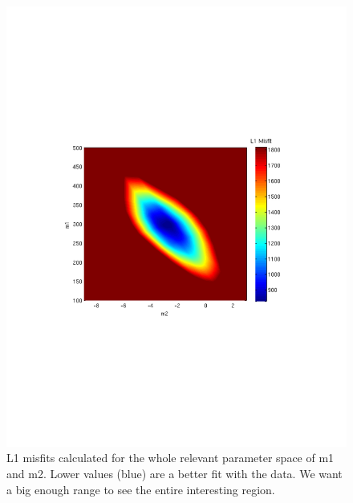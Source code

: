 \documentclass[11pt]{article}
\begin{document}
\begin{figure}[htbp]
	\centerline{\includegraphics[width=1\textwidth]{L1Misfits.pdf}}
	\caption{\label{p1}%
	L1 misfits calculated for the whole relevant parameter space of m1 and m2.  Lower values (blue) are a better fit with the data.  We want a big enough range to see the entire interesting region.}
\end{figure}
\end{document}

